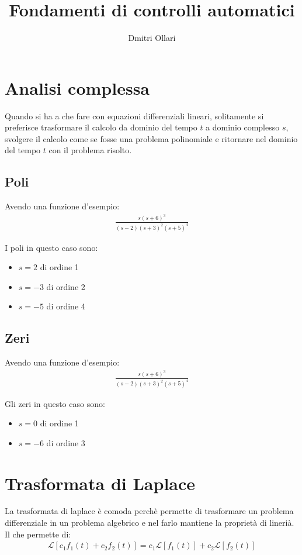 \documentclass{article}
\title{Fondamenti di controlli automatici}
\author{Dmitri Ollari}
\begin{document}
\maketitle

\tableofcontents

\section{Analisi complessa}
Quando si ha a che fare con equazioni differenziali lineari, solitamente si preferisce trasformare il calcolo da dominio del tempo $t$ a dominio complesso $s$,
svolgere il calcolo come se fosse una problema polinomiale e ritornare nel dominio del tempo $t$ con il problema risolto.

\subsection{Poli}
Avendo una funzione d'esempio:
\begin{align}
  \frac{s(s+6)^3}{(s-2)(s+3)^2(s+5)^4}
\end{align}

I poli in questo caso sono:
\begin{itemize}
  \item $s = 2$ di ordine 1
  \item $s = -3$ di ordine 2
  \item $s = -5$ di ordine 4
\end{itemize}


\subsection{Zeri}
Avendo una funzione d'esempio:
\begin{align}
  \frac{s(s+6)^3}{(s-2)(s+3)^2(s+5)^4}
\end{align}

Gli zeri in questo caso sono:
\begin{itemize}
  \item $s = 0$ di ordine 1
  \item $s = -6$ di ordine 3
\end{itemize}

\section{Trasformata di Laplace}
La trasformata di laplace \`e comoda perch\`e permette di trasformare un problema differenziale in un problema algebrico e nel farlo mantiene la proprietà di linerià.
Il che permette di:
\begin{align}
  \mathcal{L}[c_1 f_1(t) + c_2 f_2(t)] = c_1 \mathcal{L}[f_1(t)] + c_2 \mathcal{L}[f_2(t)]
\end{align}
\end{document}

